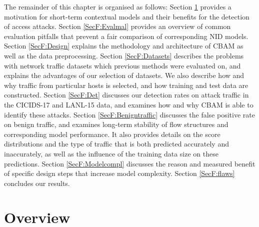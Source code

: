 The remainder of this chapter is organised as follows:
Section \ref{SecF:Over} provides a motivation for short-term contextual models and their benefits for the detection of access attacks. Section \ref{SecF:Evalmal} provides an overview of common evaluation pitfalls that prevent a fair comparison of corresponding NID models.
Section \ref{SecF:Design} explains the methodology and architecture of CBAM  as well as the data preprocessing. Section \ref{SecF:Datasets} describes the problems with network traffic datasets which previous methods were evaluated on, and explains the advantages of our selection of datasets. 
We also describe how and why traffic from particular hosts is selected, and how training and test data are constructed.
Section \ref{SecF:Det} discusses our detection rates on attack traffic in the CICIDS-17 and LANL-15 data, and examines how and why CBAM is able to identify these attacks.
Section \ref{SecF:Benigntraffic} discusses the false positive rate on benign traffic, and examines long-term stability of flow structures and corresponding model performance. It also provides details on the score distributions and the type of traffic that is both predicted accurately and inaccurately, as well as the influence of the training data size on these predictions.
Section \ref{SecF:Modelcompl} discusses the reason and measured benefit of specific design steps that increase model complexity.
Section \ref{SecF:flaws} concludes our results.%


\section{Overview}\label{SecF:Over}


